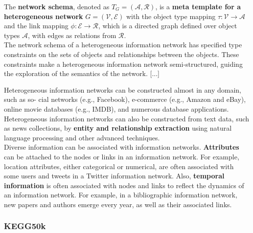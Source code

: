 \documentclass{article}
\begin{document}
\begin{itemize}
\begin{displayquote}
The \textbf{network schema}, denoted as $ T_G = (\mathcal{A}, \mathcal{R}) $, is a \textbf{meta template for a heterogeneous network} $ G = (\mathcal{V}, \mathcal{E}) $ with the object type mapping $ \tau : \mathcal{V} \rightarrow \mathcal{A} $ and the link mapping $ \phi : \mathcal{E} \rightarrow \mathcal{R} $, which is a directed graph defined over object types $ \mathcal{A} $, with edges as relations from $ \mathcal{R} $.\\
The network schema of a heterogeneous information network has specified type constraints on the sets of objects and relationships between the objects. These constraints make a heterogeneous information network semi-structured, guiding the exploration of the semantics of the network. [...]

Heterogeneous information networks can be constructed almost in any domain, such as so-
cial networks (e.g., Facebook), e-commerce (e.g., Amazon and eBay), online movie databases (e.g.,
IMDB), and numerous database applications. Heterogeneous information networks can also be constructed from text data, such as news collections, by \textbf{entity and relationship extraction} using natural language processing and other advanced techniques.\\
Diverse information can be associated with information networks. \textbf{Attributes} can be attached to the nodes or links in an information network. For example, location attributes, either categorical or numerical, are often associated with some users and tweets in a Twitter information network. Also, \textbf{temporal information} is often associated with nodes and links to reflect the dynamics of an information network. For example, in a bibliographic information network, new papers and authors emerge every year, as well as their associated links.
\end{displayquote}

\end{itemize}


\subsubsection{KEGG50k}
\end{document}

